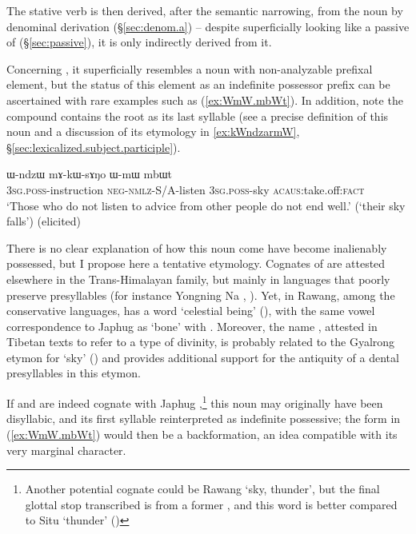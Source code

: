 The stative verb  is then derived, after the semantic narrowing, from the noun  by denominal derivation (§\ref{sec:denom.a}) -- despite superficially looking like a passive of  (§\ref{sec:passive}), it is only indirectly derived from it. 

Concerning , it superficially resembles a noun with non-analyzable  prefixal element, but the status of this element as an indefinite possessor prefix can be ascertained with rare examples such as (\ref{ex:WmW.mbWt}). In addition, note the compound  contains the root  as its last syllable (see a precise definition of this noun and a discussion of its etymology in \ref{ex:kWndzarmW}, §\ref{sec:lexicalized.subject.participle}).

\begin{exe}
\ex \label{ex:WmW.mbWt}
\gll ɯ-ndzɯ mɤ-kɯ-sɤŋo ɯ-mɯ mbɯt \\
\textsc{3sg}.\textsc{poss}-instruction \textsc{neg}-\textsc{nmlz}-S/A-listen \textsc{3sg}.\textsc{poss}-sky \textsc{acaus}:take.off:\textsc{fact} \\
\glt `Those who do not listen to advice from other people do not end well.' (`their sky falls') (elicited)
\end{exe}

There is no clear explanation of how this noun come have become inalienably possessed, but I propose here a tentative etymology. Cognates of  are attested elsewhere in the Trans-Himalayan family, but mainly in languages that poorly preserve presyllables (for instance Yongning Na , \citealt[132]{michaud17yongning}). Yet, in Rawang, among the conservative languages, has a word  `celestial being' (\citealt[13]{lapolla01rawang}), with the same vowel correspondence to Japhug  as  `bone' with . Moreover, the name , attested in Tibetan texts to refer to a type of divinity, is probably related to the Gyalrong etymon for `sky' (\citealt[63--64]{stein61}) and provides additional support for the antiquity of a dental presyllables in this etymon.

If  and  are indeed cognate with Japhug ,\footnote{Another potential cognate could be Rawang  `sky, thunder', but the final glottal stop transcribed  is from a former , and this word is better compared to Situ  `thunder' (\citealt[73]{zhang16bragdbar})} this noun may originally have been disyllabic, and its first syllable reinterpreted as indefinite possessive; the form  in (\ref{ex:WmW.mbWt}) would then be a backformation, an idea compatible with its very marginal character. 
 
